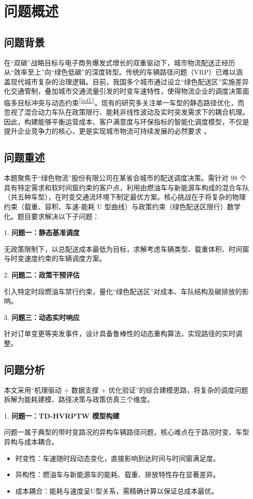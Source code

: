 \documentclass[12pt,a4paper]{article}
\begin{document}
\section{问题概述}
\subsection{问题背景}
在“双碳”战略目标与电子商务爆发式增长的双重驱动下，城市物流配送正经历从“效率至上”向“绿色低碳”的深度转型。传统的车辆路径问题（VRP）已难以涵盖现代城市复杂的治理逻辑。目前，我国多个城市通过设立“绿色配送区”实施差异化交通管制，叠加城市交通流量引发的时变车速特性，使得物流企业的调度决策面临多目标冲突与动态约束\textsuperscript{[\ref{ref1}]}。现有的研究多关注单一车型的静态路径优化，而忽视了混合动力车队在政策限行、能耗非线性波动及实时突发需求下的耦合机理。因此，构建能够平衡运营成本、客户满意度与环保指标的智能化调度模型，不仅是提升企业竞争力的核心，更是实现城市物流可持续发展的必然要求 。
\subsection{问题重述}
本题聚焦于“绿色物流”股份有限公司在某省会城市的配送调度决策。需针对 98 个具有特定需求和软时间窗约束的客户点，利用由燃油车与新能源车构成的混合车队（共五种车型），在时变交通流环境下制定最优方案。核心挑战在于将复杂的物理约束（载重、容积、车速-能耗 U 型曲线）与政策约束（绿色配送区限行）数学化。题目要求解决以下子问题：

1.  \textbf{问题一：静态基准调度}
    
    无政策限制下，以总配送成本最低为目标，求解考虑车辆类型、载重体积、时间窗与时变速度约束的车辆调度方案。

2.  \textbf{问题二：政策干预评估}
    
    引入特定时段燃油车禁行约束，量化“绿色配送区”对成本、车队结构及碳排放的影响。

3.  \textbf{问题三：动态实时响应}
    
    针对订单变更等突发事件，设计具备鲁棒性的动态重构算法，实现路径的实时调整。
\subsection{问题分析}
本文采用“机理驱动 + 数据支撑 + 优化验证”的综合建模思路，将复杂的调度问题拆解为能耗建模、路径决策与政策仿真三个维度。

1.  \textbf{问题一：TD-HVRPTW 模型构建}

问题一属于典型的带时变路况的异构车辆路径问题，核心难点在于路况时变、车型异构与成本耦合。
\begin{itemize}
    \item 时变性：车速随时段动态变化，直接影响到达时间与时间窗满足度。
    \item 异构性：燃油车与新能源车的能耗、载重、排放特性存在显著差异。
    \item 成本耦合：能耗与速度呈U型关系，需精确计算以保证总成本最优。
\end{itemize}
\end{document}
